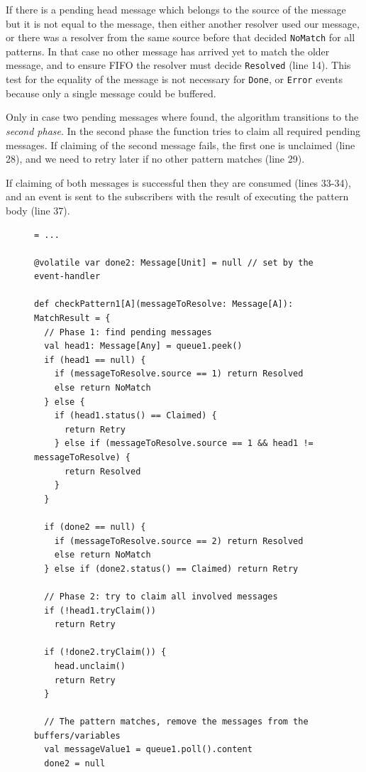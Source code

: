 \documentclass[runningheads]{llncs}
\begin{document}
\begin{sloppypar}
If there is a pending head message which belongs to the source of the message
but it is not equal to the message, then either another resolver used our
message, or there was a resolver from the same source before that decided
\texttt{NoMatch} for all patterns. In that case no other message has arrived
yet to match the older message, and to ensure FIFO the resolver must decide
\texttt{Resolved} (line 14). This test for the equality of the message is not necessary
for \texttt{Done}, or \texttt{Error} events because only a single message
could be buffered.

Only in case two pending messages where found, the algorithm transitions to
the {\em second phase}. In the second phase the function tries to claim all
required pending messages. If claiming of the second message fails, the first
one is unclaimed (line 28), and we need to retry later if no other pattern
matches (line 29).

If claiming of both messages is successful then they are consumed (lines
33-34), and an event is sent to the subscribers with the result of executing
the pattern body (line 37).

\begin{figure}[ht]
\centering
\lstset{numbers=left}
\begin{lstlisting}[escapechar=%]
val queue1: ConcurrentLinkedQueue[Int] = ... 

@volatile var done2: Message[Unit] = null // set by the event-handler

def checkPattern1[A](messageToResolve: Message[A]): MatchResult = {
  // Phase 1: find pending messages
  val head1: Message[Any] = queue1.peek()
  if (head1 == null) {
    if (messageToResolve.source == 1) return Resolved
    else return NoMatch
  } else {
    if (head1.status() == Claimed) {
      return Retry
    } else if (messageToResolve.source == 1 && head1 != messageToResolve) {
      return Resolved
    }
  }

  if (done2 == null) {
    if (messageToResolve.source == 2) return Resolved
    else return NoMatch
  } else if (done2.status() == Claimed) return Retry

  // Phase 2: try to claim all involved messages
  if (!head1.tryClaim())
    return Retry

  if (!done2.tryClaim()) {
    head.unclaim()
    return Retry
  }

  // The pattern matches, remove the messages from the buffers/variables
  val messageValue1 = queue1.poll().content
  done2 = null


\end{lstlisting}
\end{figure}
\end{sloppypar}
\end{document}
